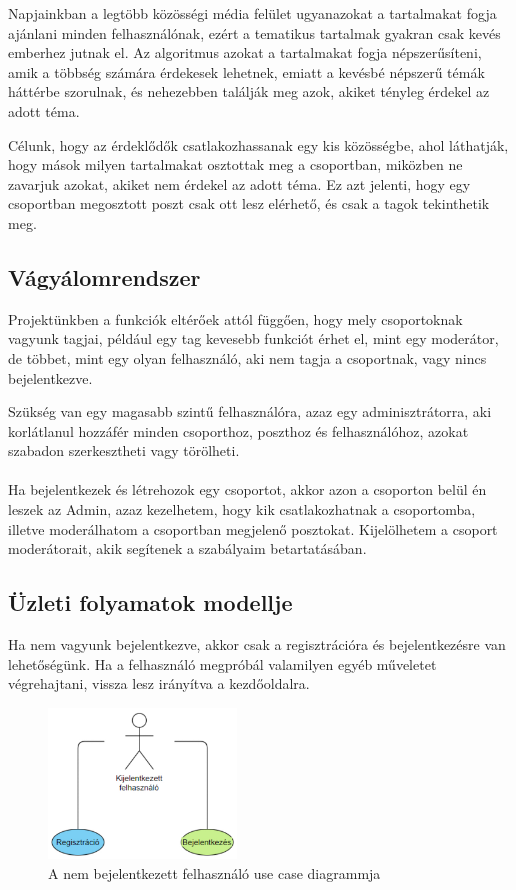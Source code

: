 \documentclass[
]{thesis-ekf}
\theoremstyle{definition}
\theoremstyle{remark}
\begin{document}
Napjainkban a legtöbb közösségi média felület ugyanazokat a tartalmakat fogja ajánlani minden felhasználónak, ezért a tematikus tartalmak gyakran csak kevés emberhez jutnak el. Az algoritmus azokat a tartalmakat fogja népszerűsíteni, amik a többség számára érdekesek lehetnek, emiatt a kevésbé népszerű témák háttérbe szorulnak, és nehezebben találják meg azok, akiket tényleg érdekel az adott téma.

Célunk, hogy az érdeklődők csatlakozhassanak egy kis közösségbe, ahol láthatják, hogy mások milyen tartalmakat osztottak meg a csoportban, miközben ne zavarjuk azokat, akiket nem érdekel az adott téma. Ez azt jelenti, hogy egy csoportban megosztott poszt csak ott lesz elérhető, és csak a tagok tekinthetik meg.

\subsection{Vágyálomrendszer}

Projektünkben a funkciók eltérőek attól függően, hogy mely csoportoknak vagyunk tagjai, például egy tag kevesebb funkciót érhet el, mint egy moderátor, de többet, mint egy olyan felhasználó, aki nem tagja a csoportnak, vagy nincs bejelentkezve.

Szükség van egy magasabb szintű felhasználóra, azaz egy adminisztrátorra, aki korlátlanul hozzáfér minden csoporthoz, poszthoz és felhasználóhoz, azokat szabadon szerkesztheti vagy törölheti.
\\\\
Ha bejelentkezek és létrehozok egy csoportot, akkor azon a csoporton belül én leszek az Admin, azaz kezelhetem, hogy kik csatlakozhatnak a csoportomba, illetve moderálhatom a csoportban megjelenő posztokat. Kijelölhetem a csoport moderátorait, akik segítenek a szabályaim betartatásában.

\subsection{Üzleti folyamatok modellje}

Ha nem vagyunk bejelentkezve, akkor csak a regisztrációra és bejelentkezésre van lehetőségünk. Ha a felhasználó megpróbál valamilyen egyéb műveletet végrehajtani, vissza lesz irányítva a kezdőoldalra.

\begin{figure}[H]
	\centering
	\includegraphics[width=5cm, height=4cm]{model_0}
	\caption{A nem bejelentkezett felhasználó use case diagrammja}
	\label{fig:picture}
\end{figure}
\end{document}
